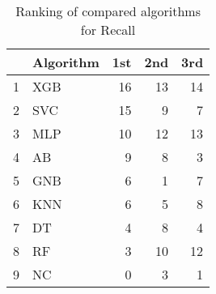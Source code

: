 \begin{table}
\footnotesize
\caption{Ranking of compared algorithms for Recall}
\label{tab:places Recall}
\begin{tabular}{llrrr}
\hline
 & Algorithm & 1st & 2nd & 3rd \\
\hline
1 & XGB & 16 & 13 & 14 \\
2 & SVC & 15 & 9 & 7 \\
3 & MLP & 10 & 12 & 13 \\
4 & AB & 9 & 8 & 3 \\
5 & GNB & 6 & 1 & 7 \\
6 & KNN & 6 & 5 & 8 \\
7 & DT & 4 & 8 & 4 \\
8 & RF & 3 & 10 & 12 \\
9 & NC & 0 & 3 & 1 \\
\hline
\end{tabular}
\end{table}

